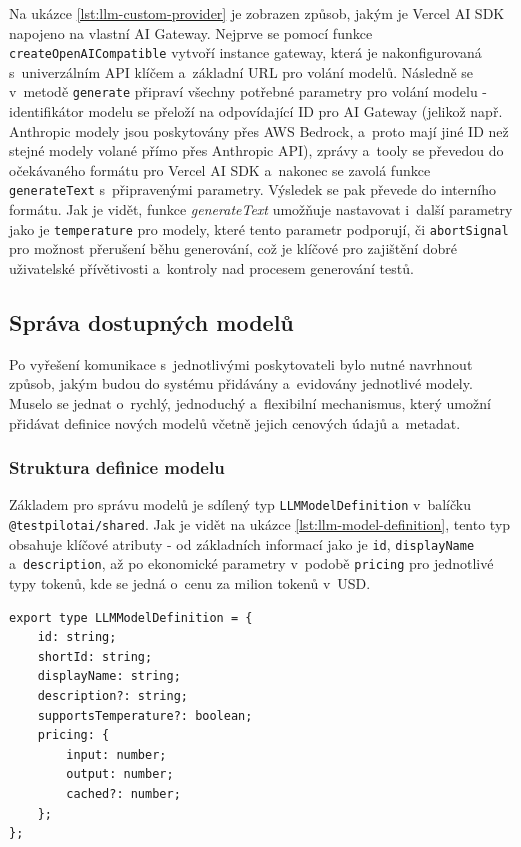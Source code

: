 \documentclass[czech, ing, kiv, he, iso690numb, viewonly]{fasthesis}
\begin{document}
Na ukázce \ref{lst:llm-custom-provider} je zobrazen způsob, jakým je Vercel AI SDK napojeno na vlastní AI Gateway.
Nejprve se pomocí funkce \texttt{createOpenAICompatible} vytvoří instance gateway, 
která je nakonfigurovaná s~univerzálním API klíčem a~základní URL pro volání modelů.
Následně se v~metodě \texttt{generate} připraví všechny potřebné parametry pro volání modelu - 
identifikátor modelu se přeloží na odpovídající ID pro AI Gateway (jelikož např. Anthropic modely jsou 
poskytovány přes AWS Bedrock, a~proto mají jiné ID než stejné modely volané přímo přes Anthropic API),
zprávy a~tooly se převedou do očekávaného formátu pro Vercel AI SDK a~nakonec se zavolá 
funkce \texttt{generateText} s~připravenými parametry. Výsledek se pak převede do interního formátu.
Jak je vidět, funkce \textsl{generateText} umožňuje nastavovat i~další parametry jako je \texttt{temperature} pro modely, 
které tento parametr podporují, či \texttt{abortSignal} pro možnost přerušení běhu generování, což je klíčové pro zajištění 
dobré uživatelské přívětivosti a~kontroly nad procesem generování testů.


\subsection{Správa dostupných modelů}

Po vyřešení komunikace s~jednotlivými poskytovateli bylo nutné navrhnout způsob,
jakým budou do systému přidávány a~evidovány jednotlivé modely.
Muselo se jednat o~rychlý, jednoduchý a~flexibilní mechanismus,
který umožní přidávat definice nových modelů včetně jejich cenových údajů a~metadat.

\subsubsection*{Struktura definice modelu}
Základem pro správu modelů je sdílený typ \texttt{LLMModelDefinition} v~balíčku
\texttt{@testpilotai/shared}. Jak je vidět na ukázce \ref{lst:llm-model-definition},
tento typ obsahuje klíčové atributy - od základních informací jako je \texttt{id}, \texttt{displayName} a~\texttt{description}, až po ekonomické parametry v~podobě \texttt{pricing} pro jednotlivé typy tokenů, kde 
se jedná o~cenu za milion tokenů v~USD.

\begin{lstlisting}[style=tscode, caption={\protect\centering Datová struktura pro konfiguraci LLM modelů.}, label={lst:llm-model-definition}]
export type LLMModelDefinition = {
    id: string;
    shortId: string;
    displayName: string;
    description?: string;
    supportsTemperature?: boolean;
    pricing: {
        input: number;   
        output: number;  
        cached?: number; 
    };
};
\end{lstlisting}
\end{document}
